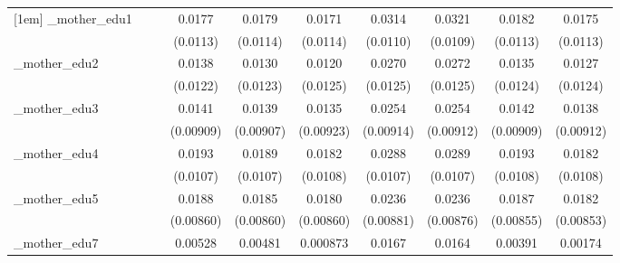 \begin{table}[htbp]
\begin{tabular}{l*{9}{c}}
[1em]
\_mother\_edu1&                     &                     &      0.0177         &      0.0179         &      0.0171         &      0.0314\sym{***}&      0.0321\sym{***}&      0.0182         &      0.0175         \\
            &                     &                     &    (0.0113)         &    (0.0114)         &    (0.0114)         &    (0.0110)         &    (0.0109)         &    (0.0113)         &    (0.0113)         \\
[1em]
\_mother\_edu2&                     &                     &      0.0138         &      0.0130         &      0.0120         &      0.0270\sym{**} &      0.0272\sym{**} &      0.0135         &      0.0127         \\
            &                     &                     &    (0.0122)         &    (0.0123)         &    (0.0125)         &    (0.0125)         &    (0.0125)         &    (0.0124)         &    (0.0124)         \\
[1em]
\_mother\_edu3&                     &                     &      0.0141         &      0.0139         &      0.0135         &      0.0254\sym{***}&      0.0254\sym{***}&      0.0142         &      0.0138         \\
            &                     &                     &   (0.00909)         &   (0.00907)         &   (0.00923)         &   (0.00914)         &   (0.00912)         &   (0.00909)         &   (0.00912)         \\
[1em]
\_mother\_edu4&                     &                     &      0.0193\sym{*}  &      0.0189\sym{*}  &      0.0182\sym{*}  &      0.0288\sym{***}&      0.0289\sym{***}&      0.0193\sym{*}  &      0.0182\sym{*}  \\
            &                     &                     &    (0.0107)         &    (0.0107)         &    (0.0108)         &    (0.0107)         &    (0.0107)         &    (0.0108)         &    (0.0108)         \\
[1em]
\_mother\_edu5&                     &                     &      0.0188\sym{**} &      0.0185\sym{**} &      0.0180\sym{**} &      0.0236\sym{***}&      0.0236\sym{***}&      0.0187\sym{**} &      0.0182\sym{**} \\
            &                     &                     &   (0.00860)         &   (0.00860)         &   (0.00860)         &   (0.00881)         &   (0.00876)         &   (0.00855)         &   (0.00853)         \\
[1em]
\_mother\_edu7&                     &                     &     0.00528         &     0.00481         &    0.000873         &      0.0167         &      0.0164         &     0.00391         &     0.00174         \\

\end{tabular}
\end{table}
